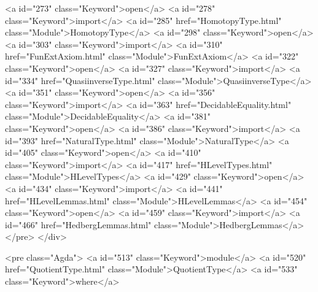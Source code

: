 <a id="273" class="Keyword">open</a> <a id="278" class="Keyword">import</a> <a id="285" href="HomotopyType.html" class="Module">HomotopyType</a>
<a id="298" class="Keyword">open</a> <a id="303" class="Keyword">import</a> <a id="310" href="FunExtAxiom.html" class="Module">FunExtAxiom</a>
<a id="322" class="Keyword">open</a> <a id="327" class="Keyword">import</a> <a id="334" href="QuasiinverseType.html" class="Module">QuasiinverseType</a>
<a id="351" class="Keyword">open</a> <a id="356" class="Keyword">import</a> <a id="363" href="DecidableEquality.html" class="Module">DecidableEquality</a>
<a id="381" class="Keyword">open</a> <a id="386" class="Keyword">import</a> <a id="393" href="NaturalType.html" class="Module">NaturalType</a>
<a id="405" class="Keyword">open</a> <a id="410" class="Keyword">import</a> <a id="417" href="HLevelTypes.html" class="Module">HLevelTypes</a>
<a id="429" class="Keyword">open</a> <a id="434" class="Keyword">import</a> <a id="441" href="HLevelLemmas.html" class="Module">HLevelLemmas</a>
<a id="454" class="Keyword">open</a> <a id="459" class="Keyword">import</a> <a id="466" href="HedbergLemmas.html" class="Module">HedbergLemmas</a>
</pre>
</div>


<pre class="Agda">
<a id="513" class="Keyword">module</a> <a id="520" href="QuotientType.html" class="Module">QuotientType</a> <a id="533" class="Keyword">where</a>

